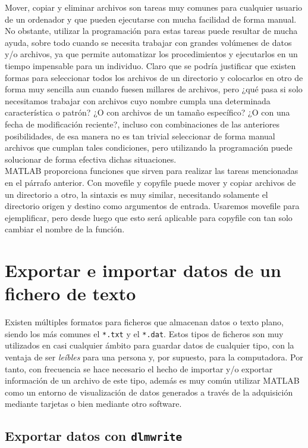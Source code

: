 Mover, copiar y eliminar archivos son tareas muy comunes para cualquier
usuario de un ordenador y que pueden ejecutarse con mucha facilidad de
forma manual. No obstante, utilizar la programación para estas tareas
puede resultar de mucha ayuda, sobre todo cuando se necesita trabajar
con grandes volúmenes de datos y/o archivos, ya que permite automatizar
los procedimientos y ejecutarlos en un tiempo impensable para un
individuo. Claro que se podría justificar que existen formas para
seleccionar todos los archivos de un directorio y colocarlos en otro de
forma muy sencilla aun cuando fuesen millares de archivos, pero ¿qué
pasa si solo necesitamos trabajar con archivos cuyo nombre cumpla una
determinada característica o patrón? ¿O con archivos de un tamaño
específico? ¿O con una fecha de modificación reciente?, incluso con
combinaciones de las anteriores posibilidades, de esa manera no es tan
trivial seleccionar de forma manual archivos que cumplan tales
condiciones, pero utilizando la programación puede solucionar de forma
efectiva dichas situaciones. \\

MATLAB proporciona funciones que sirven para realizar las tareas
mencionadas en el párrafo anterior. Con movefile y copyfile puede mover
y copiar archivos de un directorio a otro, la sintaxis es muy similar,
necesitando solamente el directorio origen y destino como argumentos de
entrada. Usaremos movefile para ejemplificar, pero desde luego que esto
será aplicable para copyfile con tan solo cambiar el nombre de la
función.

\section{Exportar e importar datos de un fichero de texto}

Existen múltiples formatos para ficheros que almacenan datos o texto
plano, siendo los más comunes el \texttt{*.txt} y el \texttt{*.dat}.
Estos tipos de ficheros son muy utilizados en casi cualquier ámbito para
guardar datos de cualquier tipo, con la ventaja de ser \emph{leíbles}
para una persona y, por supuesto, para la computadora. Por tanto, con
frecuencia se hace necesario el hecho de importar y/o exportar
información de un archivo de este tipo, además es muy común utilizar
MATLAB como un entorno de visualización de datos generados a través de
la adquisición mediante tarjetas o bien mediante otro software.

\subsection{Exportar datos con \texttt{dlmwrite}}

